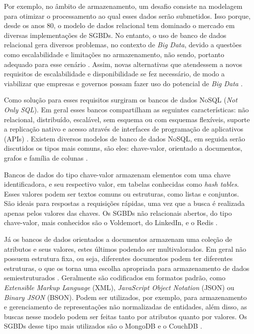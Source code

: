 Por exemplo, no âmbito de armazenamento, um desafio consiste na modelagem para otimizar o 
processamento ao qual esses dados serão submetidos. Isso porque, desde os anos 80, o modelo 
de dados relacional tem dominado o mercado em diversas implementações de SGBDs. No entanto, 
o uso de banco de dados relacional gera diversos problemas, no contexto de \textit{Big Data}, 
devido a questões como escalabilidade e limitações no armazenamento, não sendo, portanto 
adequado para esse cenário \cite{moniruzzaman2013nosql}. Assim, novas alternativas que 
atendessem a novos requisitos de escalabilidade e disponibilidade se fez necessário, de modo 
a viabilizar que empresas e governos possam fazer uso do potencial de \textit{Big Data} 
\cite{de2010nosql}.

Como solução para esses requisitos surgiram os bancos de dados NoSQL (\textit{Not Only SQL}). 
Em geral esses bancos compartilham as seguintes características: não relacional, distribuído, 
escalável, sem esquema ou com esquemas flexíveis, suporte a replicação nativo e acesso 
através de interfaces de programação de aplicativos (APIs) \cite{de2010nosql}. 
Existem diversos modelos de banco de dados NoSQL, em seguida serão discutidos os tipos mais 
comuns, são eles: chave-valor, orientado a documentos, grafos e família de colunas 
\cite{de2010nosql}.

Bancos de dados do tipo chave-valor armazenam elementos com uma chave identificadora, e seu 
respectivo valor, em tabelas conhecidas como \textit{hash tables}. Esses valores podem ser 
textos comuns ou estruturas, como listas e conjuntos. São ideais para respostas a requisições 
rápidas, uma vez que a busca é realizada apenas pelos valores das chaves. Os SGBDs não 
relacionais abertos, do tipo chave-valor, mais conhecidos são o Voldemort, do LinkedIn, e o 
Redis \cite{moniruzzaman2013nosql}.

Já os bancos de dados orientados a documentos armazenam uma coleção de atributos e seus 
valores, estes últimos podendo ser multivalorados. Em geral não possuem estrutura fixa, 
ou seja, diferentes documentos podem ter diferentes estruturas, o que os torna uma escolha 
apropriada para armazenamento de dados semiestruturados \cite{de2010nosql}. 
Geralmente são codificados em formatos padrão, como \textit{Extensible Markup Language} (XML), 
\textit{JavaScript Object Notation} (JSON) ou \textit{Binary JSON} (BSON).  Podem ser 
utilizados, por exemplo, para armazenamento e gerenciamento de representações não normalizadas 
de entidades, além disso, as buscas nesse modelo podem ser feitas tanto por atributos quanto 
por valores. Os SGBDs desse tipo mais utilizados são o MongoDB e o CouchDB 
\cite{moniruzzaman2013nosql}.

